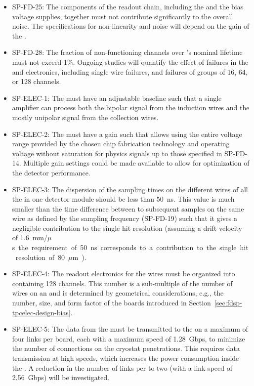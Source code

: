 \begin{itemize}
\item SP-FD-25: 
The components of the readout chain, including the 
and the bias voltage supplies, together must not contribute significantly to
the overall noise. The  specifications for non-linearity and 
noise will depend on the gain of the .

\item SP-FD-28: The fraction of non-functioning channels over 
's nominal \dunelifetime lifetime must not exceed 1\%. 
Ongoing studies will quantify the effect of failures
in the  and electronics, including
single wire failures, and failures of groups of
\num{16}, \num{64}, or \num{128} channels.

\item SP-ELEC-1: The  must have an adjustable baseline such that a single
amplifier can process both the bipolar signal from the induction wires and the mostly 
unipolar signal from the collection wires. 

\item SP-ELEC-2: The  must have a gain such that allows using the entire
voltage range provided by the chosen chip fabrication technology and operating
voltage without saturation for physics signals up to those specified in
SP-FD-14. Multiple gain settings could be made available to allow for optimization
of the detector performance.

\item SP-ELEC-3: The dispersion of the sampling times on the different wires of
all the  in one   detector module should
be less than \SI{50}{ns}. This value is much smaller than the 
time difference between to subsequent samples on the same wire
as defined by the sampling frequency (SP-FD-19) such that it gives
a negligible contribution to the single hit resolution (assuming
a drift velocity of \SI{1.6}{mm/$\mu$s} the requirement of \SI{50}{ns}
corresponds to a contribution to the single hit resolution of \SI{80}{$\mu$m}).

\item SP-ELEC-4: The readout electronics for the  wires must be organized
into  containing 128 channels. This number is a sub-multiple
of the number of wires on an  and is determined
by geometrical considerations, e.g., the number, size, and form
factor of the  boards introduced in Section~\ref{sec:fdsp-tpcelec-design-bias}.

\item SP-ELEC-5: The data from the  must be transmitted to the
 on a maximum of four links per board, each with a maximum
speed of \SI{1.28}{Gbps}, to minimize
the number of connections on the cryostat penetrations. This 
requires data transmission at high speeds, which 
increases the power consumption inside the .
A reduction in the number of links per  to two
(with a link speed of \SI{2.56}{Gbps}) will be investigated.


\end{itemize}
